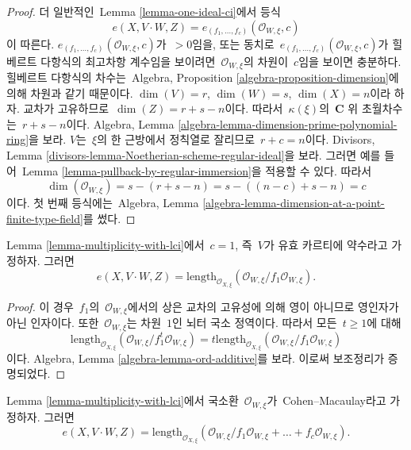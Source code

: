 \begin{proof}
더 일반적인\  Lemma \ref{lemma-one-ideal-ci}에서 등식
$$
e(X, V\cdot W, Z) = e_{(f_1, \ldots, f_c)}(\mathcal{O}_{W, \xi}, c)
$$
이 따른다.
$e_{(f_1, \ldots, f_c)}(\mathcal{O}_{W, \xi}, c)$가\  $> 0$임을, 또는 동치로\ 
$e_{(f_1, \ldots, f_c)}(\mathcal{O}_{W, \xi}, c)$가 힐베르트 다항식의
최고차항 계수임을 보이려면\  $\mathcal{O}_{W, \xi}$의 차원이\  $c$임을 보이면
충분하다. 힐베르트 다항식의 차수는\ 
Algebra, Proposition \ref{algebra-proposition-dimension}에 의해 차원과 같기
때문이다. $\dim(V) = r$, $\dim(W) = s$, $\dim(X) = n$이라 하자.
교차가 고유하므로\  $\dim(Z) = r + s - n$이다. 따라서\  $\kappa(\xi)$의\ 
$\mathbf{C}$ 위 초월차수는\  $r + s - n$이다. Algebra, Lemma
\ref{algebra-lemma-dimension-prime-polynomial-ring}을 보라.
$V$는\  $\xi$의 한 근방에서 정칙열로 잘리므로\  $r + c = n$이다.
Divisors, Lemma \ref{divisors-lemma-Noetherian-scheme-regular-ideal}을 보라.
그러면 예를 들어\  Lemma \ref{lemma-pullback-by-regular-immersion}을 적용할 수
있다. 따라서
$$
\dim(\mathcal{O}_{W, \xi}) = s - (r + s - n) = s - ((n - c) + s - n) = c
$$
이다. 첫 번째 등식에는\  Algebra, Lemma
\ref{algebra-lemma-dimension-at-a-point-finite-type-field}를 썼다.
\end{proof}

\begin{lemma}
\label{lemma-multiplicity-with-effective-Cartier-divisor}
Lemma \ref{lemma-multiplicity-with-lci}에서\  $c = 1$, 즉\  $V$가 유효 카르티에
약수라고 가정하자. 그러면
$$
e(X, V \cdot W, Z) =
\text{length}_{\mathcal{O}_{X, \xi}}
(\mathcal{O}_{W, \xi}/f_1\mathcal{O}_{W, \xi}).
$$
\end{lemma}

\begin{proof}
이 경우\  $f_1$의\  $\mathcal{O}_{W, \xi}$에서의 상은 교차의 고유성에 의해
영이 아니므로 영인자가 아닌 인자이다. 또한\  $\mathcal{O}_{W, \xi}$는
차원\  $1$인 뇌터 국소 정역이다. 따라서 모든\  $t \geq 1$에 대해
$$
\text{length}_{\mathcal{O}_{X, \xi}}
(\mathcal{O}_{W, \xi}/f_1^t\mathcal{O}_{W, \xi}) =
t \text{length}_{\mathcal{O}_{X, \xi}}
(\mathcal{O}_{W, \xi}/f_1\mathcal{O}_{W, \xi})
$$
이다. Algebra, Lemma \ref{algebra-lemma-ord-additive}를 보라.
이로써 보조정리가 증명되었다.
\end{proof}

\begin{lemma}
\label{lemma-multiplicity-lci-CM}
Lemma \ref{lemma-multiplicity-with-lci}에서 국소환\ 
$\mathcal{O}_{W, \xi}$가\  Cohen--Macaulay라고 가정하자. 그러면
$$
e(X, V \cdot W, Z) =
\text{length}_{\mathcal{O}_{X, \xi}} (\mathcal{O}_{W, \xi}/
f_1\mathcal{O}_{W, \xi} + \ldots + f_c\mathcal{O}_{W, \xi}).
$$
\end{lemma}


